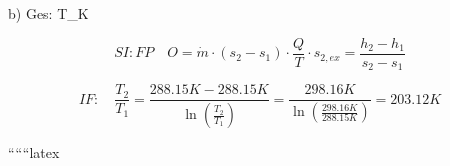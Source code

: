 b) Ges: T_{K}

\[
SI: FP \quad O = \dot{m} \cdot (s_2 - s_1) \cdot \frac{Q}{T} \cdot s_{2,ex} = \frac{h_2 - h_1}{s_2 - s_1}
\]

\[
IF: \quad \frac{T_2}{T_1} = \frac{288.15 K - 288.15 K}{\ln \left( \frac{T_2}{T_1} \right)} = \frac{298.16 K}{\ln \left( \frac{298.16 K}{288.15 K} \right)} = 203.12 K
\]

``````latex